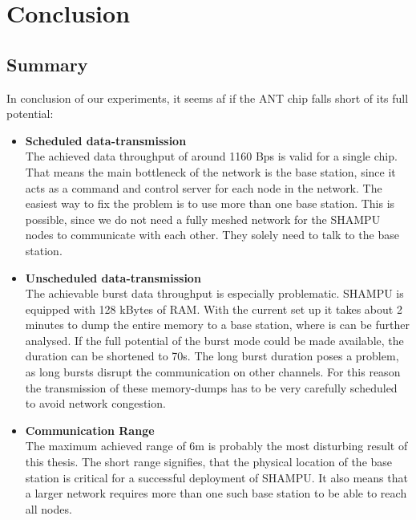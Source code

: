 \chapter{Conclusion}


\section{Summary}
In conclusion of our experiments, it seems af if the ANT chip falls short of its full potential:
\begin{itemize}
	\item{\textbf{Scheduled data-transmission}} \hfill \\ The achieved data throughput of around 1160 Bps is valid for a single chip. That means the main bottleneck of the network is the base station, since it acts as a command and control server for each node in the network. The easiest way to fix the problem is to use more than one base station. This is possible, since we do not need a fully meshed network for the SHAMPU nodes to communicate with each other. They solely need to talk to the base station.
	
	\item{\textbf{Unscheduled data-transmission}} \hfill \\ The achievable burst data throughput is especially problematic. SHAMPU is equipped with 128 kBytes of RAM. With the current set up it takes about 2 minutes to dump the entire memory to a base station, where is can be further analysed. If the full potential of the burst mode could be made available, the duration can be shortened to 70s. The long burst duration poses a problem, as long bursts disrupt the communication on other channels. For this reason the transmission of these memory-dumps has to be very carefully scheduled to avoid network congestion.
	
	\item{\textbf{Communication Range}} \hfill \\ The maximum achieved range of 6m is probably the most disturbing result of this thesis. The short range signifies, that the physical location of the base station is critical for a successful deployment of SHAMPU. It also means that a larger network requires more than one such base station to be able to reach all nodes.
\end{itemize}


